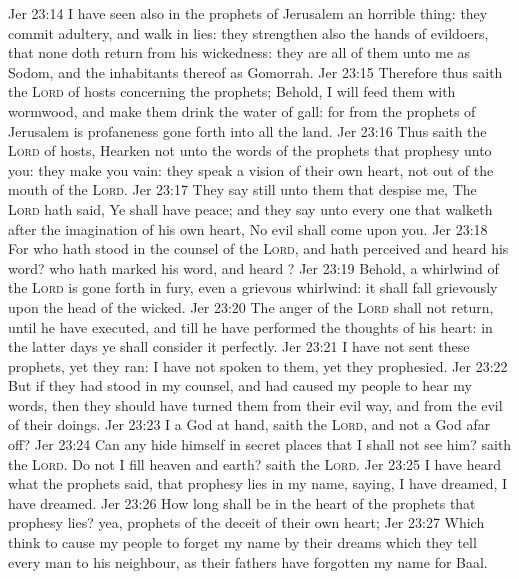 \vs Jer 23:14 I have seen also in the prophets of Jerusalem an horrible thing: they commit adultery, and walk in lies: they strengthen also the hands of evildoers, that none doth return from his wickedness: they are all of them unto me as Sodom, and the inhabitants thereof as Gomorrah.
\vs Jer 23:15 Therefore thus saith the \textsc{Lord} of hosts concerning the prophets; Behold, I will feed them with wormwood, and make them drink the water of gall: for from the prophets of Jerusalem is profaneness gone forth into all the land.
\vs Jer 23:16 Thus saith the \textsc{Lord} of hosts, Hearken not unto the words of the prophets that prophesy unto you: they make you vain: they speak a vision of their own heart,  not out of the mouth of the \textsc{Lord}.
\vs Jer 23:17 They say still unto them that despise me, The \textsc{Lord} hath said, Ye shall have peace; and they say unto every one that walketh after the imagination of his own heart, No evil shall come upon you.
\vs Jer 23:18 For who hath stood in the counsel of the \textsc{Lord}, and hath perceived and heard his word? who hath marked his word, and heard ?
\vs Jer 23:19 Behold, a whirlwind of the \textsc{Lord} is gone forth in fury, even a grievous whirlwind: it shall fall grievously upon the head of the wicked.
\vs Jer 23:20 The anger of the \textsc{Lord} shall not return, until he have executed, and till he have performed the thoughts of his heart: in the latter days ye shall consider it perfectly.
\vs Jer 23:21 I have not sent these prophets, yet they ran: I have not spoken to them, yet they prophesied.
\vs Jer 23:22 But if they had stood in my counsel, and had caused my people to hear my words, then they should have turned them from their evil way, and from the evil of their doings.
\vs Jer 23:23  I a God at hand, saith the \textsc{Lord}, and not a God afar off?
\vs Jer 23:24 Can any hide himself in secret places that I shall not see him? saith the \textsc{Lord}. Do not I fill heaven and earth? saith the \textsc{Lord}.
\vs Jer 23:25 I have heard what the prophets said, that prophesy lies in my name, saying, I have dreamed, I have dreamed.
\vs Jer 23:26 How long shall  be in the heart of the prophets that prophesy lies? yea,  prophets of the deceit of their own heart;
\vs Jer 23:27 Which think to cause my people to forget my name by their dreams which they tell every man to his neighbour, as their fathers have forgotten my name for Baal.
